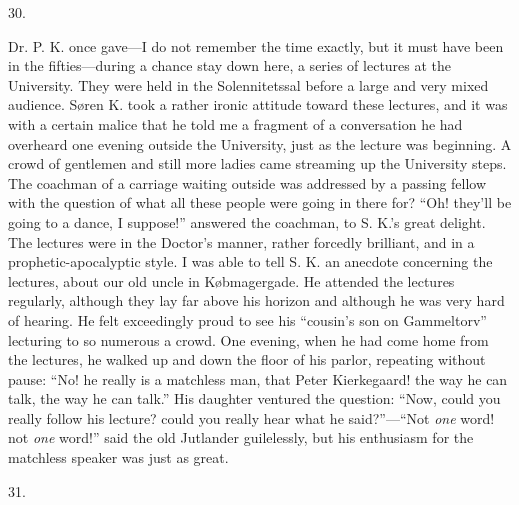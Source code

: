 \documentclass[12pt,a4paper,openany]{book}
\newcommand{\secnum}[1]{\par\begin{center}#1\end{center}\par\nobreak}
\newcommand{\opage}[1]{\marginnote{\footnotesize\textit{[#1]}}}
\begin{document}
\secnum{30.}

Dr. P. K. once gave---I do not remember the time exactly,
but it must have been in the fifties---during a chance
stay down here, a series of lectures at the
University. They were held in the Solennitetssal before a large
and very mixed audience. Søren K. took
a rather ironic attitude toward these lectures, and it was with
a certain malice that he told me a fragment of a
conversation he had overheard one evening outside the University,
just as the lecture was beginning. A crowd of
gentlemen and still more ladies came streaming up the University steps.
The coachman of a carriage waiting outside was
addressed by a passing fellow with the question
of what all these people were going in there for? ``Oh! they'll be going
to a dance, I suppose!'' answered the coachman, to S. K.'s great delight.
The lectures were in the Doctor's manner, rather
forcedly brilliant, and in a prophetic-apocalyptic style. I
was able to tell S. K. an anecdote concerning the lectures,
about our old uncle in Købmagergade.
He attended the lectures regularly, although they lay
far above his horizon and although he was very
hard of hearing. He felt exceedingly proud to see his
``cousin's son on Gammeltorv'' lecturing to so numerous a
\opage{359}crowd. One evening, when he had come home from the lectures,
he walked up and down the floor of his parlor,
repeating without pause: ``No! he really is a matchless man,
that Peter Kierkegaard! the way he can talk, the way
he can talk.'' His daughter ventured the
question: ``Now, could you really follow his lecture?
could you really hear what he said?''---``Not \emph{one}
word! not \emph{one} word!'' said the old Jutlander guilelessly,
but his enthusiasm for the matchless speaker was just as great.

\secnum{31.}
\end{document}
